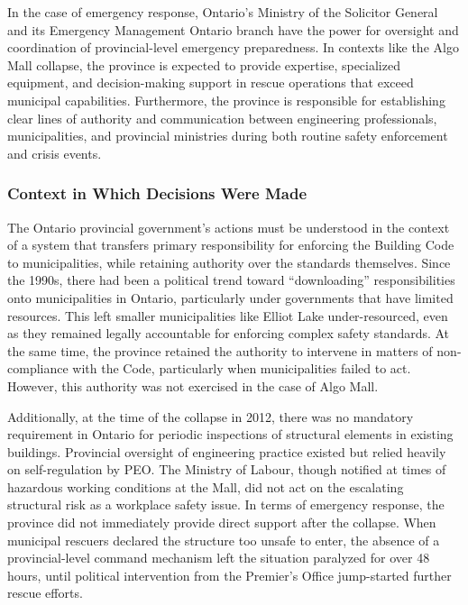 \documentclass[12pt]{article}
\begin{document}
In the case of emergency response, Ontario's Ministry of the Solicitor General and its Emergency Management Ontario branch have the power for oversight and coordination of provincial-level emergency preparedness. In contexts like the Algo Mall collapse, the province is expected to provide expertise, specialized equipment, and decision-making support in rescue operations that exceed municipal capabilities. Furthermore, the province is responsible for establishing clear lines of authority and communication between engineering professionals, municipalities, and provincial ministries during both routine safety enforcement and crisis events.

\subsubsection*{Context in Which Decisions Were Made}

The Ontario provincial government's actions must be understood in the context of a system that transfers primary responsibility for enforcing the Building Code to municipalities, while retaining authority over the standards themselves. Since the 1990s, there had been a political trend toward ``downloading'' responsibilities onto municipalities in Ontario, particularly under governments that have limited resources. This left smaller municipalities like Elliot Lake under-resourced, even as they remained legally accountable for enforcing complex safety standards. At the same time, the province retained the authority to intervene in matters of non-compliance with the Code, particularly when municipalities failed to act. However, this authority was not exercised in the case of Algo Mall.

Additionally, at the time of the collapse in 2012, there was no mandatory requirement in Ontario for periodic inspections of structural elements in existing buildings. Provincial oversight of engineering practice existed but relied heavily on self-regulation by PEO. The Ministry of Labour, though notified at times of hazardous working conditions at the Mall, did not act on the escalating structural risk as a workplace safety issue. In terms of emergency response, the province did not immediately provide direct support after the collapse. When municipal rescuers declared the structure too unsafe to enter, the absence of a provincial-level command mechanism left the situation paralyzed for over 48 hours, until political intervention from the Premier's Office jump-started further rescue efforts.
\end{document}
